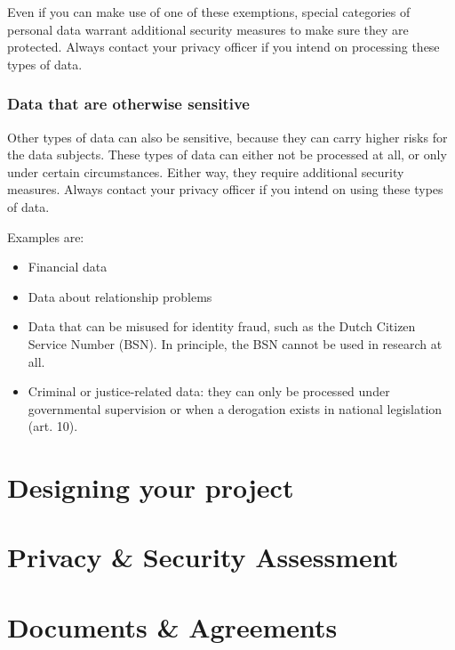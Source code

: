 \documentclass[
]{book}
\providecommand{\tightlist}{%
  \setlength{\itemsep}{0pt}\setlength{\parskip}{0pt}}
\begin{document}
Even if you can make use of one of these exemptions, special categories of
personal data warrant additional security measures to make sure they are
protected. Always contact your
privacy officer
if you intend on processing these types of data.

\hypertarget{data-that-are-otherwise-sensitive}{%
\subsection{Data that are otherwise sensitive}\label{data-that-are-otherwise-sensitive}}

Other types of data can also be sensitive, because they can carry higher risks
for the data subjects. These types of data can either not be processed at all,
or only under certain circumstances. Either way, they require additional
security measures. Always contact your
privacy officer
if you intend on using these types of data.

Examples are:

\begin{itemize}
\tightlist
\item
  Financial data
\item
  Data about relationship problems
\item
  Data that can be misused for identity fraud, such as the Dutch Citizen
  Service Number (BSN). In principle, the BSN cannot be used in research at all.
\item
  Criminal or justice-related data: they can only be processed under
  governmental supervision or when a derogation exists in national legislation
  (art. 10).
\end{itemize}

\hypertarget{privacy-by-design}{%
\chapter{Designing your project}\label{privacy-by-design}}

\hypertarget{risk-assessment}{%
\chapter{Privacy \& Security Assessment}\label{risk-assessment}}

\hypertarget{legal-documents}{%
\chapter{Documents \& Agreements}\label{legal-documents}}
\end{document}
